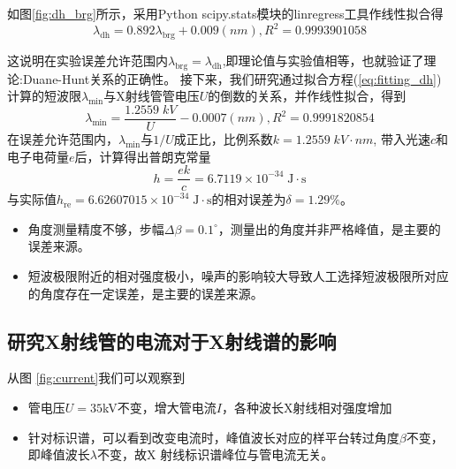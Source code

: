 \documentclass{whureport}
\begin{document}
\begin{multicols}{2}
	如图\ref{fig:dh_brg}所示，采用Python scipy.stats模块的linregress工具作线性拟合得
	\begin{equation}\label{eq:fitting_dh}
		\lambda_{\text{dh}}=0.892\lambda_{\text{brg}}+0.009(\unit{nm}), R^2=0.9993901058
	\end{equation}
	
	这说明在实验误差允许范围内$\lambda_{\text{brg}}=\lambda_{\text{dh}}$,即理论值与实验值相等，也就验证了理论:Duane-Hunt关系的正确性。
	接下来，我们研究通过拟合方程(\ref{eq:fitting_dh})计算的短波限$\lambda_{\min}$与X射线管管电压$U$的倒数的关系，并作线性拟合，得到
	\begin{equation}
		\lambda_{\min}=\dfrac{1.2559\;\unit{kV}}{U}-0.0007 (\unit{nm}), R^2=0.9991820854
	\end{equation}
	在误差允许范围内，$\lambda_{\min}$与$1/U$成正比，比例系数$k=1.2559\;\unit{kV}\cdot\unit{nm}$, 带入光速$c$和电子电荷量$e$后，计算得出普朗克常量
	\begin{equation}
		h=\dfrac{ek}{c}=6.7119\times10^{-34}\;\text{J}\cdot\text{s}
	\end{equation}
	与实际值$h_{\text{re}}=6.62607015\times10^{-34}\;\text{J}\cdot\text{s}$的相对误差为$\delta=1.29\%$。
	
	\begin{itemize}
		\item 角度测量精度不够，步幅$\Delta\beta=0.1^\circ$，测量出的角度并非严格峰值，是主要的误差来源。
		\item 短波极限附近的相对强度极小，噪声的影响较大导致人工选择短波极限所对应的角度存在一定误差，是主要的误差来源。
	\end{itemize}
	\subsection{研究X射线管的电流对于X射线谱的影响}
	从图 \ref{fig:current}我们可以观察到
	\begin{itemize}
		\item 管电压$U=35 $kV不变，增大管电流$I$，各种波长X射线相对强度增加
		\item 针对标识谱，可以看到改变电流时，峰值波长对应的样平台转过角度$\beta$不变，即峰值波长$\lambda$不变，故X 射线标识谱峰位与管电流无关。
	\end{itemize}

\end{multicols}
\end{document}
